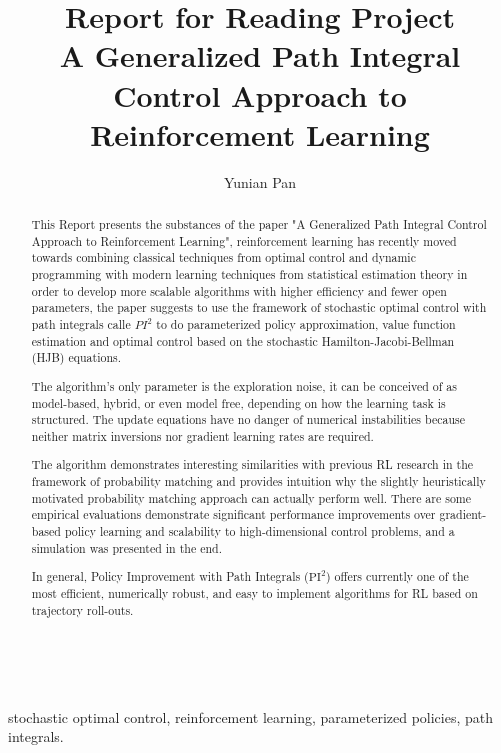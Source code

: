 \documentclass[journal]{IEEEtran}
\begin{document}
\title{Report for Reading Project\\ A Generalized Path Integral Control Approach to Reinforcement Learning}





\author{Yunian Pan}




\maketitle

\begin{abstract}

This Report presents the substances of the paper "A Generalized Path Integral Control Approach to Reinforcement Learning", reinforcement learning has recently moved towards
combining classical techniques from optimal control and dynamic programming with modern learning techniques from statistical estimation theory in order to develop more scalable algorithms
with higher efficiency and fewer open parameters, the paper suggests to use the framework of stochastic optimal control with path integrals calle $PI^2$ to do parameterized policy approximation,  
 value function estimation and optimal control based on the stochastic Hamilton-Jacobi-Bellman (HJB) equations.
 
The algorithm's only parameter is the exploration noise, it can be conceived of as model-based, hybrid, or even model free,
depending on how the learning task is structured. 
The update equations have no danger of
numerical instabilities because neither matrix inversions nor gradient learning rates are required. 

The algorithm demonstrates interesting similarities with previous RL research in the framework
of probability matching and provides intuition why the slightly heuristically motivated probability
matching approach can actually perform well. 
There are some empirical evaluations demonstrate significant performance improvements over gradient-based policy learning and scalability to high-dimensional
control problems, and a simulation was presented in the end.

In general,
Policy Improvement with Path Integrals ($\mbox{PI}^2$) offers currently one of the most efficient, numerically robust, and easy to implement algorithms for RL based on trajectory roll-outs.
\end{abstract}
\ \\
\begin{IEEEkeywords}
stochastic optimal control, reinforcement learning, parameterized policies, path integrals.
\end{IEEEkeywords}
\end{document}
